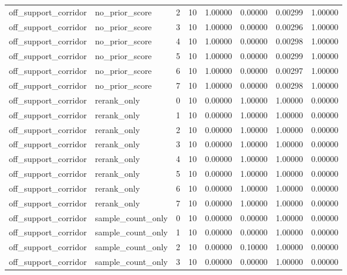 \documentclass{article}
\begin{document}
\begin{table}[tbp]
{\begin{tabular}{llllllll}
off\_support\_corridor & no\_prior\_score & 2 & 10 & 1.00000 & 0.00000 & 0.00299 & 1.00000 \\
off\_support\_corridor & no\_prior\_score & 3 & 10 & 1.00000 & 0.00000 & 0.00296 & 1.00000 \\
off\_support\_corridor & no\_prior\_score & 4 & 10 & 1.00000 & 0.00000 & 0.00298 & 1.00000 \\
off\_support\_corridor & no\_prior\_score & 5 & 10 & 1.00000 & 0.00000 & 0.00299 & 1.00000 \\
off\_support\_corridor & no\_prior\_score & 6 & 10 & 1.00000 & 0.00000 & 0.00297 & 1.00000 \\
off\_support\_corridor & no\_prior\_score & 7 & 10 & 1.00000 & 0.00000 & 0.00298 & 1.00000 \\
off\_support\_corridor & rerank\_only & 0 & 10 & 0.00000 & 1.00000 & 1.00000 & 0.00000 \\
off\_support\_corridor & rerank\_only & 1 & 10 & 0.00000 & 1.00000 & 1.00000 & 0.00000 \\
off\_support\_corridor & rerank\_only & 2 & 10 & 0.00000 & 1.00000 & 1.00000 & 0.00000 \\
off\_support\_corridor & rerank\_only & 3 & 10 & 0.00000 & 1.00000 & 1.00000 & 0.00000 \\
off\_support\_corridor & rerank\_only & 4 & 10 & 0.00000 & 1.00000 & 1.00000 & 0.00000 \\
off\_support\_corridor & rerank\_only & 5 & 10 & 0.00000 & 1.00000 & 1.00000 & 0.00000 \\
off\_support\_corridor & rerank\_only & 6 & 10 & 0.00000 & 1.00000 & 1.00000 & 0.00000 \\
off\_support\_corridor & rerank\_only & 7 & 10 & 0.00000 & 1.00000 & 1.00000 & 0.00000 \\
off\_support\_corridor & sample\_count\_only & 0 & 10 & 0.00000 & 0.00000 & 1.00000 & 0.00000 \\
off\_support\_corridor & sample\_count\_only & 1 & 10 & 0.00000 & 0.00000 & 1.00000 & 0.00000 \\
off\_support\_corridor & sample\_count\_only & 2 & 10 & 0.00000 & 0.10000 & 1.00000 & 0.00000 \\
off\_support\_corridor & sample\_count\_only & 3 & 10 & 0.00000 & 0.00000 & 1.00000 & 0.00000 \\
\bottomrule
\end{tabular}
}
\end{table}

\clearpage
\end{document}
